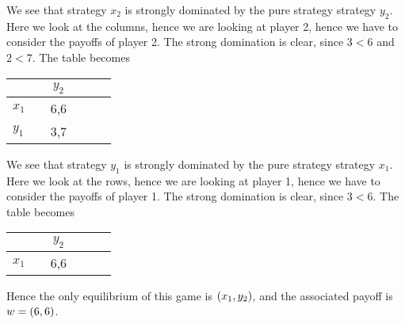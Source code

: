 We see that strategy $x_{2}$ is strongly dominated by the pure strategy strategy $y_{2}$. Here we look at the columns, hence we are looking at player 2, hence we have to consider the payoffs of player 2. The strong domination is clear, since $3 < 6$ and $2 < 7$. The table becomes

\begin{tabular}[h!]{l|ccccc}
		&& $y_2$ \\
		\hline
		$x_1$ && 6,6 & \\
		$y_1$ && 3,7 &
	\end{tabular} 
  
  \vspace{5mm}
  
We see that strategy $y_{1}$ is strongly dominated by the pure strategy strategy $x_{1}$. Here we look at the rows, hence we are looking at player 1, hence we have to consider the payoffs of player 1. The strong domination is clear, since $3 < 6$. The table becomes

\begin{tabular}[h!]{l|ccccc}
		&& $y_2$ \\
		\hline
		$x_1$ && 6,6 &
\end{tabular} 

\vspace{5mm}

Hence the only equilibrium of this game is $\left(x_1, y_2\right)$, and the associated payoff is $w = \left(6,6\right)$.